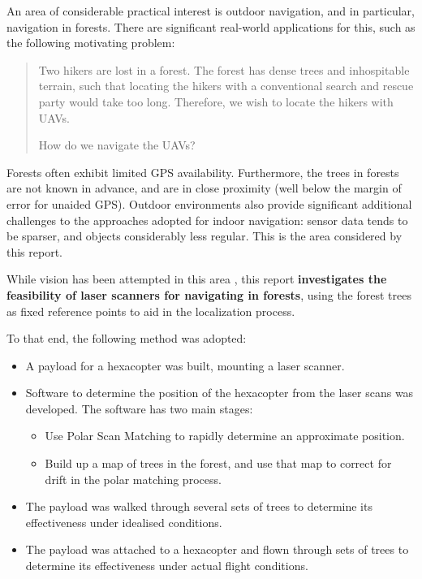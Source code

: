 \documentclass[12pt,oneside,a4paper]{book}
\begin{document}
An area of considerable practical interest is outdoor navigation, and
in particular, navigation in forests.  There are significant real-world
applications for this, such as the following motivating problem:
\begin{quote}
  Two hikers are lost in a forest. The forest has dense trees and
  inhospitable terrain, such that locating the hikers with a
  conventional search and rescue party would take too long. Therefore,
  we wish to locate the hikers with UAVs.

  How do we navigate the UAVs?
\end{quote}

Forests often exhibit limited GPS availability. Furthermore,
the trees in forests are not known in advance, and are in close
proximity (well below the margin of error for unaided GPS). Outdoor
environments also provide significant additional challenges to the
approaches adopted for indoor navigation: sensor data tends to be
sparser, and objects considerably less regular. This is the area
considered by this report.

While vision has been attempted in this area
\cite{langelaan2005towards}, this report \textbf{investigates the
  feasibility of laser scanners for navigating in forests}, using the
forest trees as fixed reference points to aid in the localization
process.


To that end, the following method was adopted:
\begin{itemize}
\item A payload for a hexacopter was built, mounting a laser scanner.
\item Software to determine the position of the hexacopter from the
  laser scans was developed. The software has two main stages:
  \begin{itemize}
  \item Use Polar Scan Matching to rapidly determine an approximate
    position.
  \item Build up a map of trees in the forest, and use that map to
    correct for drift in the polar matching process.
  \end{itemize}
\item The payload was walked through several sets of trees to determine
  its effectiveness under idealised conditions.
\item The payload was attached to a hexacopter and flown through sets
  of trees to determine its effectiveness under actual flight conditions.
\end{itemize}
\end{document}
